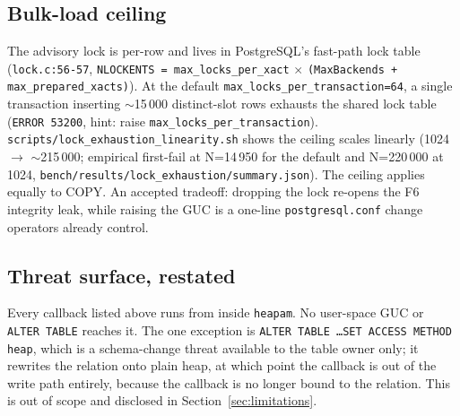 \documentclass[sigconf, nonacm]{acmart}
\begin{document}
\subsection{Bulk-load ceiling}
The advisory lock is per-row and lives in PostgreSQL's fast-path lock table (\texttt{lock.c:56-57}, \texttt{NLOCKENTS = max\_locks\_per\_xact} $\times$ \texttt{(MaxBackends + max\_prepared\_xacts)}). At the default \texttt{max\_locks\_per\_transaction=64}, a single transaction inserting $\sim$15\,000 distinct-slot rows exhausts the shared lock table (\texttt{ERROR 53200}, hint: raise \texttt{max\_locks\_per\_transaction}). \texttt{scripts/lock\_exhaustion\_linearity.sh} shows the ceiling scales linearly (1024 $\to$ $\sim$215\,000; empirical first-fail at N=14\,950 for the default and N=220\,000 at 1024, \texttt{bench/results/lock\_exhaustion/summary.json}). The ceiling applies equally to COPY. An accepted tradeoff: dropping the lock re-opens the F6 integrity leak, while raising the GUC is a one-line \texttt{postgresql.conf} change operators already control.

\subsection{Threat surface, restated}
Every callback listed above runs from inside \texttt{heapam}. No user-space GUC or \texttt{ALTER TABLE} reaches it. The one exception is \texttt{ALTER TABLE \dots SET ACCESS METHOD heap}, which is a schema-change threat available to the table owner only; it rewrites the relation onto plain heap, at which point the callback is out of the write path entirely, because the callback is no longer bound to the relation. This is out of scope and disclosed in Section~\ref{sec:limitations}.
\end{document}
